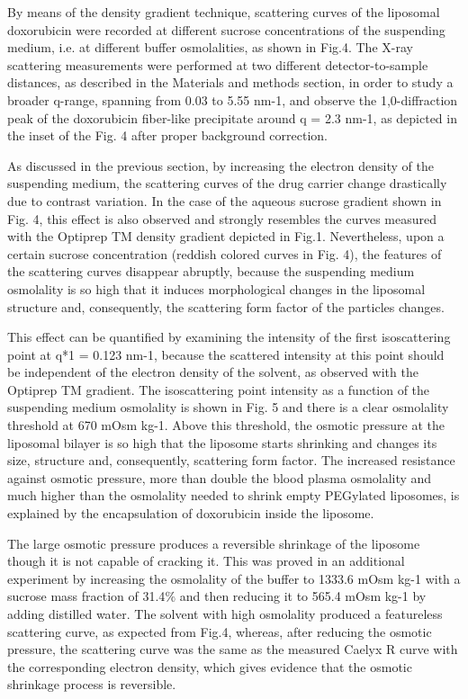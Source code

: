 By means of the density gradient technique, scattering curves of the liposomal doxorubicin were recorded at different sucrose concentrations of the suspending medium, i.e. at different buffer osmolalities, as shown in Fig.4. The X-ray scattering measurements were performed at two different detector-to-sample distances, as described in the Materials and methods section, in order to study a broader q-range, spanning from 0.03 to 5.55 nm-1, and observe the 1,0-diffraction peak of the doxorubicin fiber-like precipitate around q = 2.3 nm-1, as depicted in the inset of the Fig. 4 after proper background correction.

As discussed in the previous section, by increasing the electron density of the suspending medium, the scattering curves of the drug carrier change drastically due to contrast variation. In the case of the aqueous sucrose gradient shown in Fig. 4, this effect is also observed and strongly resembles the curves measured with the Optiprep TM density gradient depicted in Fig.1. Nevertheless, upon a certain sucrose concentration (reddish colored curves in Fig. 4), the features of the scattering curves disappear abruptly, because the suspending medium osmolality is so high that it induces morphological changes in the liposomal structure and, consequently, the scattering form factor of the particles changes.

This effect can be quantified by examining the intensity of the first isoscattering point at q*1 = 0.123 nm-1, because the scattered intensity at this point should be independent of the electron density of the solvent, as observed with the Optiprep TM gradient. The isoscattering point intensity as a function of the suspending medium osmolality is shown in Fig. 5 and there is a clear osmolality threshold at 670 mOsm kg-1. Above this threshold, the osmotic pressure at the liposomal bilayer is so high that the liposome starts shrinking and changes its size, structure and, consequently, scattering form factor. The increased resistance against osmotic pressure, more than double the blood plasma osmolality and much higher than the osmolality needed to shrink empty PEGylated liposomes, is explained by the encapsulation of doxorubicin inside the liposome.

The large osmotic pressure produces a reversible shrinkage of the liposome though it is not capable of cracking it. This was proved in an additional experiment by increasing the osmolality of the buffer to 1333.6 mOsm kg-1 with a sucrose mass fraction of 31.4$\%$ and then reducing it to 565.4 mOsm kg-1 by adding distilled water. The solvent with high osmolality produced a featureless scattering curve, as expected from Fig.4, whereas, after reducing the osmotic pressure, the scattering curve was the same as the measured Caelyx R curve with the corresponding electron density, which gives evidence that the osmotic shrinkage process is reversible.

